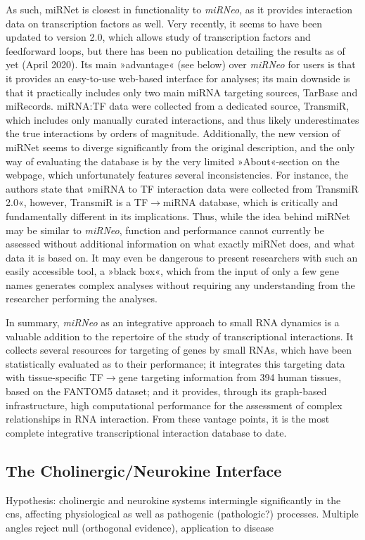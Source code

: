 As such, miRNet\cite{Fan2016} is closest in functionality to \emph{miRNeo}, as it provides interaction data on transcription factors as well. Very recently, it seems to have been updated to version 2.0, which allows study of transcription factors and feedforward loops, but there has been no publication detailing the results as of yet (April 2020). Its main »advantage« (see below) over \emph{miRNeo} for users is that it provides an easy-to-use web-based interface for analyses; its main downside is that it practically includes only two main miRNA targeting sources, TarBase and miRecords. miRNA:TF data were collected from a dedicated source, TransmiR, which includes only manually curated interactions, and thus likely underestimates the true interactions by orders of magnitude. Additionally, the new version of miRNet seems to diverge significantly from the original description,\cite{Fan2016} and the only way of evaluating the database is by the very limited »About«-section on the webpage, which unfortunately features several inconsistencies. For instance, the authors state that »miRNA to TF interaction data were collected from TransmiR 2.0«, however, TransmiR is a TF$\to$miRNA database, which is critically and fundamentally different in its implications. Thus, while the idea behind miRNet may be similar to \emph{miRNeo}, function and performance cannot currently be assessed without additional information on what exactly miRNet does, and what data it is based on. It may even be dangerous to present researchers with such an easily accessible tool, a »black box«, which from the input of only a few gene names generates complex analyses without requiring any understanding from the researcher performing the analyses.

In summary, \emph{miRNeo} as an integrative approach to small RNA dynamics is a valuable addition to the repertoire of the study of transcriptional interactions. It collects several resources for targeting of genes by small RNAs, which have been statistically evaluated as to their performance; it integrates this targeting data with tissue-specific TF$\to$gene targeting information from 394 human tissues, based on the \mbox{FANTOM5} dataset; and it provides, through its graph-based infrastructure, high computational performance for the assessment of complex relationships in RNA interaction. From these vantage points, it is the most complete integrative transcriptional interaction database to date.

\subsection{The Cholinergic/Neurokine Interface}
Hypothesis: cholinergic and neurokine systems intermingle significantly in the cns, affecting physiological as well as pathogenic (pathologic?) processes. Multiple angles reject null (orthogonal evidence), application to disease


